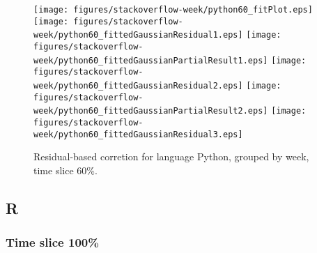 \begin{figure}[t]
\centering
{}
{\texttt{[image: figures/stackoverflow-week/python60\_fitPlot.eps]}}
{\texttt{[image: figures/stackoverflow-week/python60\_fittedGaussianResidual1.eps]}}
{\texttt{[image: figures/stackoverflow-week/python60\_fittedGaussianPartialResult1.eps]}}
{\texttt{[image: figures/stackoverflow-week/python60\_fittedGaussianResidual2.eps]}}
{\texttt{[image: figures/stackoverflow-week/python60\_fittedGaussianPartialResult2.eps]}}
{\texttt{[image: figures/stackoverflow-week/python60\_fittedGaussianResidual3.eps]}}
\caption{Residual-based corretion for language Python, grouped by week, time slice 60\%.}
\end{figure}


\FloatBarrier


\subsection{R}

\subsubsection{Time slice 100\%}

